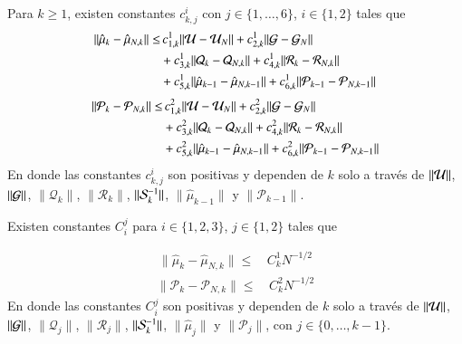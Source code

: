 \begin{prop}
	Para $k \geq 1$, existen constantes $c_{k,j}^i$ con $j \in \{ 1, \dots, 6\}$, $i \in \{ 1, 2\}$ tales que
	\begin{equation*}
		\begin{aligned}
			\| \hat \mu_{k} - \hat \mu_{N,k}  \| \leq & \, c_{1,k}^1 \| \U - \U_N \| +  c_{2,k}^1 \| \G - \G_N \| \\ 
			&+ c_{3,k}^1 \| \mathcal{Q}_{k} - \mathcal{Q}_{N, k} \| +c_{4,k}^1 \| \mathcal{R}_{k} - \mathcal{R}_{N, k} \| \\
			& + c_{5,k}^1 \| \hat \mu_{k-1} - \hat \mu_{N, k-1} \| + c_{6,k}^1 \| \mathcal{P}_{k-1} - \mathcal{P}_{N, k-1} \|
		\end{aligned}
		\label{}
	\end{equation*}
	\begin{equation*}
		\begin{aligned}
			\| \mathcal{P}_{k} - \mathcal{P}_{N,k} \| \leq & \, c_{1,k}^2 \| \U - \U_N \| +  c_{2,k}^2 \| \G - \G_N \| \\ 
			&+ c_{3,k}^2 \| \mathcal{Q}_{k} - \mathcal{Q}_{N, k} \| +c_{4,k}^2 \| \mathcal{R}_{k} - \mathcal{R}_{N, k} \| \\
			& + c_{5,k}^2 \| \hat \mu_{k-1} - \hat \mu_{N, k-1} \| + c_{6,k}^2 \| \mathcal{P}_{k-1} - \mathcal{P}_{N, k-1} \|
		\end{aligned}
	\end{equation*}
	En donde las constantes $c_{k,j}^i$ son positivas y dependen de $k$ solo a través de $\| \U \| $, $\| \G \| $, $\| \mathcal{Q}_{k} \| $, $\| \mathcal{R}_{k} \| $, $\| \S_{k}^{-1} \| $, $\| \hat{\mu}_{k-1} \| $ y $\| \mathcal{P}_{k-1} \| $.
	\label{prop:err_kkkf_1}
\end{prop}
\begin{prop}
	Existen constantes $C_i^j$ para $i \in \{1, 2, 3\}$, $j \in \{1, 2\}$ tales que
	
	\begin{equation*}
		\begin{aligned}
			\| \hat \mu_{k} - \hat \mu_{N,k}  \| \leq & \, C_{k}^1 N^{-1/2}
		\end{aligned}
	\end{equation*}
	\begin{equation*}
		\begin{aligned}
			\| \mathcal{P}_{k} - \mathcal{P}_{N,k}  \| \leq & \, C_{k}^2 N^{-1/2} 
		\end{aligned}
	\end{equation*}
	En donde las constantes $C_i^j$ son positivas y dependen de $k$ solo a través de $\| \U \| $, $\| \G \| $, $\| \mathcal{Q}_{j} \| $, $\| \mathcal{R}_{j} \| $, $\| \S_{k}^{-1} \| $, $\| \hat{\mu}_{j} \| $ y $\| \mathcal{P}_{j} \| $, con $j \in \{ 0, \dots, k-1\}$.
		\label{prop:err_kkkf_2}
\end{prop}
